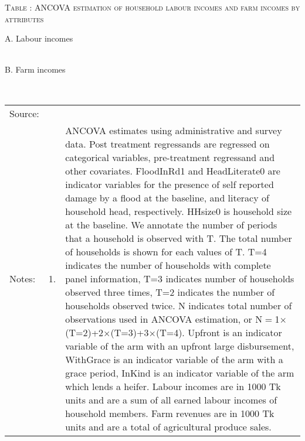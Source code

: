\hspace{-1cm}\begin{minipage}[t]{14cm}
\hfil\textsc{\normalsize Table \thetable: ANCOVA estimation of household labour incomes and farm incomes by attributes \label{tab ANCOVA labour incomes attributes}}\\
\setlength{\tabcolsep}{.5pt}
\setlength{\baselineskip}{8pt}
\renewcommand{\arraystretch}{.55}

\vspace{2ex}
A. Labour incomes\\
\hfil{}\\
B. Farm incomes\\
\hfil{}\\
\renewcommand{\arraystretch}{.8}
\setlength{\tabcolsep}{1pt}
\begin{tabular}{>{\hfill\scriptsize}p{1cm}<{}>{\hfill\scriptsize}p{.25cm}<{}>{\scriptsize}p{12cm}<{\hfill}}
Source:& \multicolumn{2}{l}{\scriptsize Estimated with GUK administrative and survey data.}\\
Notes: & 1. & ANCOVA estimates using administrative and survey data. Post treatment regressands are regressed on categorical variables, pre-treatment regressand and other covariates. \textsf{FloodInRd1} and \textsf{HeadLiterate0} are indicator variables for the presence of self reported damage by a flood at the baseline, and literacy of household head, respectively. \textsf{HHsize0} is household size at the baseline. We annotate the number of periods that a household is observed with \textsf{T}. The total number of households is shown for each values of \textsf{T}. \textsf{T=4} indicates the number of households with complete panel information, \textsf{T=3} indicates number of households observed three times, \textsf{T=2} indicates the number of households observed twice. \textsf{N} indicates total number of observations used in ANCOVA estimation, or \textsf{N$=$1$\times$(T=2)+2$\times$(T=3)+3$\times$(T=4)}.  \textsf{Upfront} is an indicator variable of the arm with an upfront large disbursement, \textsf{WithGrace} is an indicator variable of the arm with a grace period, \textsf{InKind} is an indicator variable of the arm which lends a heifer. Labour incomes are in 1000 Tk units and are a sum of all earned labour incomes of household members. Farm revenues are in 1000 Tk units and are a total of agricultural produce sales.\\

\end{tabular}
\end{minipage}
